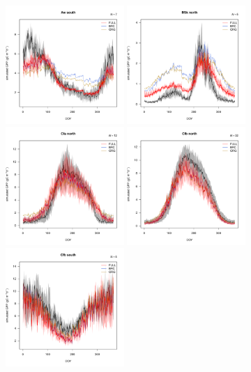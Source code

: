 \documentclass{myreport}
\begin{document}
 \begin{figure}[!ht]
    \centering
\includegraphics[width=0.4\textwidth]{fig/meandoy_byzone_Awsouth_all.pdf}
\includegraphics[width=0.4\textwidth]{fig/meandoy_byzone_BSknorth_all.pdf}\\
\includegraphics[width=0.4\textwidth]{fig/meandoy_byzone_Cfanorth_all.pdf}
\includegraphics[width=0.4\textwidth]{fig/meandoy_byzone_Cfbnorth_all.pdf}\\
\includegraphics[width=0.4\textwidth]{fig/meandoy_byzone_Cfbsouth_all.pdf}

\end{figure}
\end{document}
